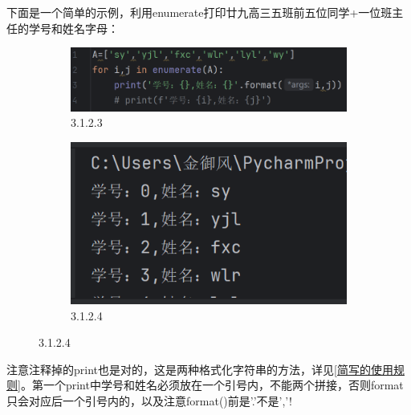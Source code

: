 \documentclass[12pt]{article}
\begin{document}
下面是一个简单的示例，利用enumerate打印廿九高三五班前五位同学+一位班主任的学号和姓名字母：
\begin{figure}[H]
    \centering
    \begin{subfigure}[b]{0.6\textwidth}
        \includegraphics[width=\textwidth]{enumerate program1.png} %
        \caption{3.1.2.3}
        \label{fig:line-graph2}
    \end{subfigure}
    \hfill
    \begin{subfigure}[b]{0.35\textwidth}
        \includegraphics[width=\textwidth]{enumerate output1.png} %
        \caption{3.1.2.4}
        \label{fig:line-graph2-pic2}
    \end{subfigure}
\end{figure}
\noindent 注意注释掉的print也是对的，这是两种格式化字符串的方法，详见\ref{简写的使用规则}。第一个print中学号和姓名必须放在一个引号内，不能两个拼接，否则format只会对应后一个引号内的{}，以及注意format()前是'.'不是','!
\end{document}
